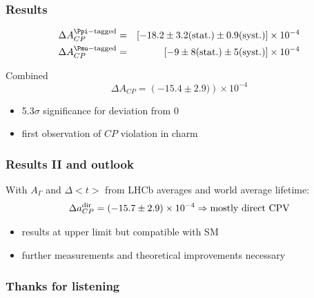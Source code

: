 \documentclass[18pt, aspectratio=169]{beamer}
\begin{document}
\begin{frame}
  \frametitle{Results}
  \begin{eqnarray*}
    \Delta A_{CP}^{\Ppi-\mathrm{tagged}} & = & \left[-18.2 \pm 3.2 (\mathrm{stat.}) \pm 0.9
                                               (\mathrm{syst.} )\right] \times 10^{-4} \\
    \Delta A_{CP}^{\Pmu-\mathrm{tagged}} & = & \left[-9 \pm 8 (\mathrm{stat.}) \pm 5
                                               (\mathrm{syst.} )\right] \times 10^{-4} \\
  \end{eqnarray*}

  \begin{block}{Combined}
    \begin{equation*}
          \Delta A_{CP} = \left(-15.4 \pm 2.9)\right) \times 10^{-4}
        \end{equation*}
        \begin{itemize}
        \item \textcolor{kit-red100}{5.3$\sigma$} significance for deviation from 0
        \item first observation of $CP$ violation in charm
        \end{itemize}
\end{block}

\end{frame}

\begin{frame}
  \frametitle{Results II and outlook}
  With $A_\Gamma$ and $\Delta <t>$ from LHCb averages and world average \PDzero lifetime:
\begin{equation*}
  \Delta a_{CP}^{\rm dir} = \left(-15.7 \pm 2.9\right) \times 10^{-4} \Rightarrow \text{mostly direct CPV}
\end{equation*}
\begin{itemize}
\item results at upper limit but compatible with SM
\item further measurements and theoretical improvements necessary
\end{itemize}
\end{frame}

\begin{frame}
  \frametitle{Thanks for listening}
  
\end{frame}
\end{document}
